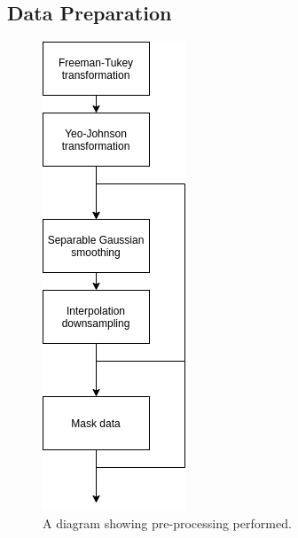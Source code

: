             \subsection{Data Preparation} \label{sec:pca_data_driven_surrogate_signal_extraction_methods_for_dynamic_pet_methods_data_preparation}
                \begin{figure}
                    \centering
                    
                    \includegraphics[width=0.4\linewidth]{figures/data_driven_surrogate_signal_extraction_methods_1_pre_processing.png}
                    
                    \captionsetup{singlelinecheck=false, justification=centering}
                    \caption{A diagram showing pre-processing performed.}
                    \label{fig:pca_data_driven_surrogate_signal_extraction_methods_for_dynamic_pet_methods_pre_processing}
                \end{figure}
                
